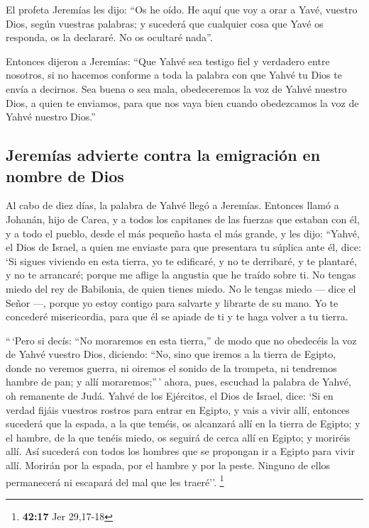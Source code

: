  El profeta Jeremías les dijo: ``Os he oído. He aquí que
voy a orar a Yavé, vuestro Dios, según vuestras palabras; y sucederá que
cualquier cosa que Yavé os responda, os la declararé. No os ocultaré
nada''.

 Entonces dijeron a Jeremías: ``Que Yahvé sea testigo fiel
y verdadero entre nosotros, si no hacemos conforme a toda la palabra con
que Yahvé tu Dios te envía a decirnos.  Sea buena o sea
mala, obedeceremos la voz de Yahvé nuestro Dios, a quien te enviamos,
para que nos vaya bien cuando obedezcamos la voz de Yahvé nuestro
Dios.''

\hypertarget{jeremuxedas-advierte-contra-la-emigraciuxf3n-en-nombre-de-dios}{%
\subsection{Jeremías advierte contra la emigración en nombre de
Dios}\label{jeremuxedas-advierte-contra-la-emigraciuxf3n-en-nombre-de-dios}}

 Al cabo de diez días, la palabra de Yahvé llegó a
Jeremías.  Entonces llamó a Johanán, hijo de Carea, y a
todos los capitanes de las fuerzas que estaban con él, y a todo el
pueblo, desde el más pequeño hasta el más grande,  y les
dijo: ``Yahvé, el Dios de Israel, a quien me enviaste para que
presentara tu súplica ante él, dice:  `Si sigues viviendo
en esta tierra, yo te edificaré, y no te derribaré, y te plantaré, y no
te arrancaré; porque me aflige la angustia que he traído sobre ti.
 No tengas miedo del rey de Babilonia, de quien tienes
miedo. No le tengas miedo --- dice el Señor ---, porque yo estoy contigo
para salvarte y librarte de su mano.  Yo te concederé
misericordia, para que él se apiade de ti y te haga volver a tu tierra.

 ``\,`Pero si decís: ``No moraremos en esta tierra,'' de
modo que no obedecéis la voz de Yahvé vuestro Dios, 
diciendo: ``No, sino que iremos a la tierra de Egipto, donde no veremos
guerra, ni oiremos el sonido de la trompeta, ni tendremos hambre de pan;
y allí moraremos;''\,'  ahora, pues, escuchad la palabra
de Yahvé, oh remanente de Judá. Yahvé de los Ejércitos, el Dios de
Israel, dice: `Si en verdad fijáis vuestros rostros para entrar en
Egipto, y vais a vivir allí,  entonces sucederá que la
espada, a la que teméis, os alcanzará allí en la tierra de Egipto; y el
hambre, de la que tenéis miedo, os seguirá de cerca allí en Egipto; y
moriréis allí.  Así sucederá con todos los hombres que se
propongan ir a Egipto para vivir allí. Morirán por la espada, por el
hambre y por la peste. Ninguno de ellos permanecerá ni escapará del mal
que les traeré''. \footnote{\textbf{42:17} Jer 29,17-18}


